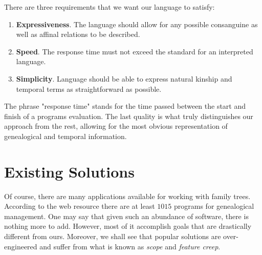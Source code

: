     There are three requirements that we want our language to satisfy:
    \begin{enumerate}
        \item{\textbf{Expressiveness}. The language should allow for any possible consanguine as well as affinal relations to be
            described.}
        \item{\textbf{Speed}. The response time must not exceed the standard for an interpreted language.}
        \item{\textbf{Simplicity}. Language should be able to express natural kinship and temporal terms as straightforward as possible.}
    \end{enumerate}
    The phrase "response time" stands for the time passed between the start and finish of a programs evaluation. The last quality is
    what truly distinguishes our approach from the rest, allowing for the most obvious representation of genealogical and temporal
    information.

\section{Existing Solutions}
    Of course, there are many applications available for working with family trees. According to the web resource\cite{gensoft} there
    are at least $1015$ programs for genealogical management. One may say that given such an abundance of software, there is
    nothing more to add. However, most of it accomplish goals that are drastically different from ours. Moreover, we shall see that
    popular solutions are over-engineered and suffer from what is known as \textit{scope} and \textit{feature creep}.

